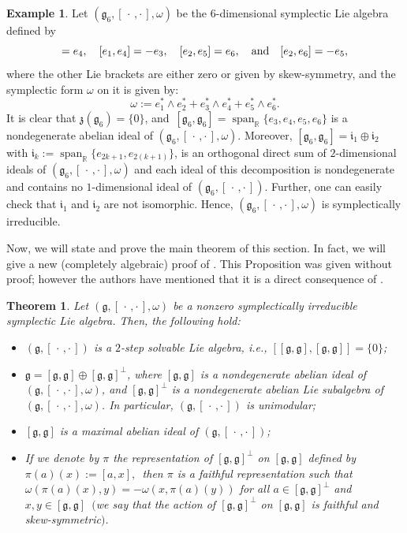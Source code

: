 \documentclass[final,1p,times,nopreprintline]{elsarticle}
\newtheorem{theorem}{Theorem}[section]
\theoremstyle{definition}
\newtheorem{example}{Example}[section]
\numberwithin{equation}{section}
\newcommand{\rel}{\mathbb{R}}
\newcommand{\w}{\omega}
\newcommand{\et}{\quad \textnormal{and}\quad}
\newcommand{\g}{\mathfrak{g}}
\newcommand{\Span}{\operatorname{span}}
\numberwithin{equation}{section}
\newcommand{\z}{\mathfrak{z}}
\newcommand{\ii}{\mathfrak{i}}
\newcommand{\cro}{[\,\cdot\,,\cdot\,]}
\begin{document}
\begin{example}\label{ExSympIrrDim6}
	Let $(\g_6,[\,\cdot\,,\cdot\,],\w)$ be the $6$-dimensional symplectic Lie algebra defined by
	\begin{equation*}
		[e_1,e_3]= e_4,\quad [e_1,e_4]=-e_3,\quad [e_2,e_5]= e_6,\et [e_2,e_6]=-e_5,
	\end{equation*} 
where the other Lie brackets are either zero or given by skew-symmetry, and the symplectic form $\w$ on it is given by: $$\w:=e_1^*\wedge e_2^*+e_3^*\wedge e_4^*+e_5^*\wedge e_6^*.$$ It is clear that $\z(\g_6)=\{0\}$, and $\,[\g_6,\g_6]=\Span_\rel\{e_3,e_4,e_5,e_6\}$ is a nondegenerate abelian ideal of $(\g_6,\cro,\w)$. Moreover,  $[\g_6,\g_6]=\ii_1\oplus\ii_2$ with $\ii_k:=\Span_\rel\{e_{2k+1},e_{2(k+1)}\}$, is an orthogonal direct sum of $2$-dimensional ideals of $(\g_6,\cro,\w)$ and each ideal of this decomposition is nondegenerate and contains no $1$-dimensional ideal of $(\g_6,\cro)$. Further, one can easily check that $\ii_1$ and $\ii_2$ are not isomorphic. Hence, $(\g_6,\cro,\w)$ is symplectically irreducible.
\end{example}


Now, we will state and prove the main theorem of this section. In fact, we will give a new (completely algebraic) proof of \cite[Proposition 2.4.2, p. 37]{Bau}. This Proposition was given without proof; however the authors have mentioned that it is a direct consequence of \cite[Theorem 1.3, p. 211]{DM}.

\begin{theorem}\label{T1SymplIrredu}
	Let $(\g,[\,\cdot\,,\cdot\,],\w)$ be a nonzero symplectically irreducible symplectic Lie algebra. Then, the following hold:
	\begin{itemize}
		\item[$1.$] $(\g,\cro)$ is a $2$-step solvable Lie algebra, i.e., $\left[[\g,\g],[\g,\g]\right]=\{0\}$;
		\item[$2.$] $\g=[\g,\g]\oplus[\g,\g]^\perp$, where $[\g,\g]$ is a nondegenerate abelian ideal of $(\g,\cro,\w)$, and $[\g,\g]^\perp$ is a nondegenerate abelian Lie subalgebra of $(\g,\cro,\w)$. In particular, $(\g,\cro)$ is unimodular;
		\item[$3.$] $[\g,\g]$ is a maximal abelian ideal of $(\g,\cro)$;
		\item[$4.$] If we denote by $\pi$ the representation of $[\g,\g]^\perp$ on $[\g,\g]$ defined by $\pi(a)(x):= [a,x],\,$  then $\pi$ is a faithful representation such that $\w\left(\pi(a)(x),y\right)= -\w\left(x,\pi(a)(y)\right)$ for all $a \in [\g,\g]^\perp$ and $x, y \in [\g,\g]\,$ $($we say that the action of $[\g,\g]^\perp$ on $[\g,\g]$ is faithful and skew-symmetric$)$.
	\end{itemize}
\end{theorem}
\end{document}
